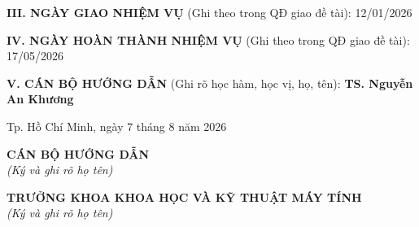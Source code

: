 \vspace{0.5cm}
\noindent\textbf{III. NGÀY GIAO NHIỆM VỤ} (Ghi theo trong QĐ giao đề tài): 12/01/2026

\vspace{0.3cm}
\noindent\textbf{IV. NGÀY HOÀN THÀNH NHIỆM VỤ} (Ghi theo trong QĐ giao đề tài): 17/05/2026

\vspace{0.3cm}
\noindent\textbf{V. CÁN BỘ HƯỚNG DẪN} (Ghi rõ học hàm, học vị, họ, tên): \textbf{TS. Nguyễn An Khương}

\vspace{0.5cm}
\begin{flushright}
Tp. Hồ Chí Minh, ngày 7 tháng 8 năm 2026
\end{flushright}

\vspace{0.5cm}
\noindent
\begin{minipage}{0.48\textwidth}
    \centering
    \textbf{CÁN BỘ HƯỚNG DẪN}\\
    \textit{(Ký và ghi rõ họ tên)}
\end{minipage}
\hfill
\begin{minipage}{0.48\textwidth}
    \centering
    \textbf{TRƯỞNG KHOA KHOA HỌC VÀ KỸ THUẬT MÁY TÍNH}\\
    \textit{(Ký và ghi rõ họ tên)}
\end{minipage}

\clearpage
